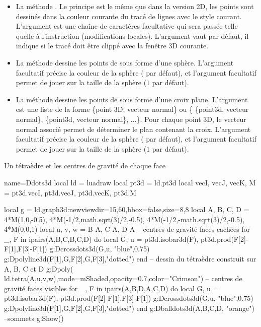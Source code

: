 \begin{itemize}
    \item La méthode . Le principe est le même que dans la version 2D, les points sont dessinés dans la couleur courante du tracé de lignes avec le style courant. L'argument  est une chaîne de caractères facultative qui sera passée telle quelle à l'instruction \drawcmd (modifications locales). L'argument  vaut \false par défaut, il indique si le tracé doit être clippé avec la fenêtre 3D courante.
    
    \item La méthode  dessine les points de  sous forme d'une sphère. L'argument facultatif  précise la couleur de la sphère ( par défaut), et l'argument facultatif  permet de jouer sur la taille de la sphère ($1$ par défaut).
    
    \item La méthode  dessine les points de  sous forme d'une croix plane. L'argument  est une liste de la forme \{point 3D, vecteur normal\} ou \{ \{point3d, vecteur normal\}, \{point3d, vecteur normal\}, ...\}. Pour chaque point 3D, le vecteur normal associé permet de déterminer le plan contenant la croix. L'argument facultatif  précise la couleur de la sphère ( par défaut), et l'argument facultatif  permet de jouer sur la taille de la sphère ($1$ par défaut).
\end{itemize}

\begin{demo}{Un tétraèdre et les centres de gravité de chaque face}
\begin{luadraw}{name=Ddots3d}
local ld = luadraw
local pt3d = ld.pt3d
local vecI, vecJ, vecK, M = pt3d.vecI, pt3d.vecJ, pt3d.vecK, pt3d.M

local g = ld.graph3d:new{viewdir={15,60},bbox=false,size={8,8}}
local A, B, C, D = 4*M(1,0,-0.5), 4*M(-1/2,math.sqrt(3)/2,-0.5), 4*M(-1/2,-math.sqrt(3)/2,-0.5), 4*M(0,0,1)
local u, v, w = B-A, C-A, D-A
-- centres de gravité faces cachées
for _, F in ipairs({{A,B,C},{B,C,D}}) do
local G, u = pt3d.isobar3d(F), pt3d.prod(F[2]-F[1],F[3]-F[1])
g:Dcrossdots3d({G,u}, "blue",0.75)
g:Dpolyline3d({{F[1],G,F[2]},{G,F[3]}},"dotted")
end
-- dessin du tétraèdre construit sur A, B, C et D
g:Dpoly( ld.tetra(A,u,v,w),{mode=mShaded,opacity=0.7,color="Crimson"})
-- centres de gravité faces visibles
for _, F in ipairs({{A,B,D},{A,C,D}}) do
    local G, u = pt3d.isobar3d(F), pt3d.prod(F[2]-F[1],F[3]-F[1])
    g:Dcrossdots3d({G,u}, "blue",0.75)
    g:Dpolyline3d({{F[1],G,F[2]},{G,F[3]}},"dotted")
end
g:Dballdots3d({A,B,C,D}, "orange") --sommets
g:Show()
\end{luadraw}
\end{demo}

